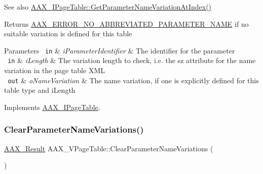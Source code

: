 \begin{DoxyItemize}
\item \begin{DoxySeeAlso}{See also}
\mbox{\hyperlink{a01849_adffe5a5f2ad548bd4c704508d816d568}{A\+A\+X\+\_\+\+I\+Page\+Table\+::\+Get\+Parameter\+Name\+Variation\+At\+Index()}}
\end{DoxySeeAlso}
\begin{DoxyReturn}{Returns}
\mbox{\hyperlink{a00494_a5f8c7439f3a706c4f8315a9609811937ab7383b0169f6dfa5f86b1fefd6c58ae2}{A\+A\+X\+\_\+\+E\+R\+R\+O\+R\+\_\+\+N\+O\+\_\+\+A\+B\+B\+R\+E\+V\+I\+A\+T\+E\+D\+\_\+\+P\+A\+R\+A\+M\+E\+T\+E\+R\+\_\+\+N\+A\+ME}} if no suitable variation is defined for this table
\end{DoxyReturn}

\begin{DoxyParams}[1]{Parameters}
\mbox{\texttt{ in}}  & {\em i\+Parameter\+Identifier} & The identifier for the parameter \\
\hline
\mbox{\texttt{ in}}  & {\em i\+Length} & The variation length to check, i.\+e. the {\ttfamily sz} attribute for the name variation in the page table X\+ML \\
\hline
\mbox{\texttt{ out}}  & {\em o\+Name\+Variation} & The name variation, if one is explicitly defined for this table type and {\ttfamily i\+Length} \\
\hline
\end{DoxyParams}

\end{DoxyItemize}

Implements \mbox{\hyperlink{a01849_a6ddd61f6ba18b8be8141363d5234ed9d}{A\+A\+X\+\_\+\+I\+Page\+Table}}.

\mbox{\label{a01929_a4ec9e2d32eeb51ae589bc2e10c08a03d}} 
\subsubsection{\texorpdfstring{ClearParameterNameVariations()}{ClearParameterNameVariations()}}
{\footnotesize\ttfamily \mbox{\hyperlink{a00392_a4d8f69a697df7f70c3a8e9b8ee130d2f}{A\+A\+X\+\_\+\+Result}} A\+A\+X\+\_\+\+V\+Page\+Table\+::\+Clear\+Parameter\+Name\+Variations (\begin{DoxyParamCaption}{ }\end{DoxyParamCaption})\hspace{0.3cm}{\ttfamily [virtual]}}






